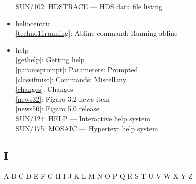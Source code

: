 \documentclass[11pt,twoside]{article}
\newcommand{\htmlref}[2]{#1}
\newcommand{\xref}[3]{#1}
\newcommand{\idxint}[2]{\ref{#1}: \htmlref{#2}{#1}}
\newcommand{\idxint}[2]{\htmlref{#2}{#1}}
\newcommand{\latorhtm}[2]{#1}
\newcommand{\latorhtm}[2]{#2}
\begin{document}
\begin{itemize}
   \xref{SUN/102: HDSTRACE \latorhtm{---}{-} HDS data file listing}{sun102}{}
\item heliocentric\\
   \idxint{techno11running}{Abline command: Running abline}
\item help\\
   \idxint{gethelp}{Getting help}\\
   \idxint{paramsprompt}{Parameters: Prompted}\\
   \idxint{classifmisc}{Commands: Miscellany}\\
   \idxint{changes}{Changes}\\
   \idxint{news32}{Figaro 3.2 news item}\\
   \idxint{news50}{Figaro 5.0 release}\\
   \xref{SUN/124: HELP \latorhtm{---}{-} Interactive help system}{sun124}{}\\
   \xref{SUN/175: MOSAIC \latorhtm{---}{-} Hypertext help system}{sun175}{}
\end{itemize}

\subsection*{\label{index_I}I}

\begin{htmlonly}
\htmlref{A}{index_A}
\htmlref{B}{index_B}
\htmlref{C}{index_C}
\htmlref{D}{index_D}
\htmlref{E}{index_E}
\htmlref{F}{index_F}
\htmlref{G}{index_G}
\htmlref{H}{index_H}
I
\htmlref{J}{index_J}
\htmlref{K}{index_K}
\htmlref{L}{index_L}
\htmlref{M}{index_M}
\htmlref{N}{index_N}
\htmlref{O}{index_O}
\htmlref{P}{index_P}
\htmlref{Q}{index_Q}
\htmlref{R}{index_R}
\htmlref{S}{index_S}
\htmlref{T}{index_T}
\htmlref{U}{index_U}
\htmlref{V}{index_V}
\htmlref{W}{index_W}
\htmlref{X}{index_X}
\htmlref{Y}{index_Y}
Z
\end{htmlonly}
\end{document}
